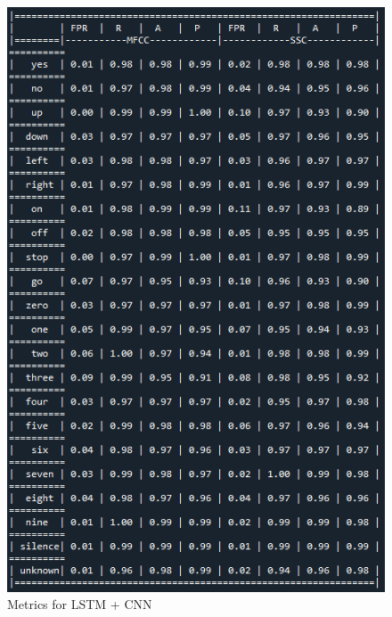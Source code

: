 \begin{appendices}
\begin{figure}[h!]
    \includegraphics[width=1\textwidth]{chapters/pictures/lstm_cnn_table.PNG}
    \caption{Metrics for LSTM + CNN}
    \label{fig:table_lstm_cnn}
\end{figure}
\newpage
\end{appendices}